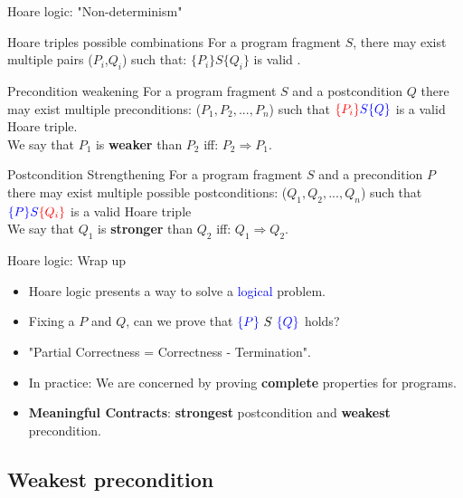 \begin{frame}{Hoare logic: "Non-determinism"}

\begin{Block}{Hoare triples possible combinations }
	For a program fragment $S$, there may exist multiple pairs ($P_i$,$Q_i$) such that: $\{P_i\} S \{Q_i\} $ is valid .
\end{Block}
\begin{block}{Precondition weakening}
For a program fragment $S$ and a postcondition $Q$ there may exist
 multiple preconditions: ($P_1, P_2, ..., P_n$) such that $\color{red} \{P_i\} \color{blue} S \{Q\}$ is a valid Hoare triple.\\
	We say that $P_1$ is \textbf{weaker} than $P_2$ iff: $
	P_2 \Rightarrow P_1$.
\end{block}	


\begin{block}{Postcondition Strengthening}
	For a program fragment $S$ and a precondition $P$ there may exist
	multiple possible postconditions: ($Q_1, Q_2, ..., Q_n$) such that $\color{blue} \{P\}  S \color{red}\{Q_i\}$ is a valid Hoare triple\\
	We say that $Q_1$ is \textbf{stronger} than $Q_2$ iff: $
	Q_1 \Rightarrow Q_2$.
\end{block}	

\end{frame}

\begin{frame}{Hoare logic: Wrap up}
\begin{itemize}
\item Hoare logic presents a way to solve a \textcolor{blue}{logical} problem.
\item Fixing a $P$ and $Q$, can we prove that $\color{blue}\{P\} \color{black}~S~\color{blue}\{Q\}$ holds?
\item "Partial Correctness = Correctness - Termination". 
\item In practice: We are concerned by proving \textbf{complete} properties for programs.
\item \textbf{Meaningful Contracts}: \textbf{ strongest} postcondition and \textbf{weakest} precondition.
\end{itemize}
\end{frame}
\subsection{Weakest precondition}

